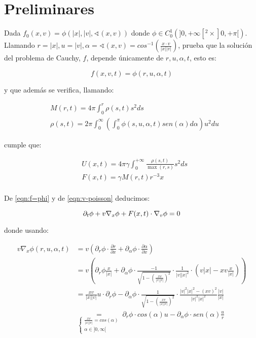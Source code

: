 \documentclass[a4paper,10pt]{scrartcl}
\theoremstyle{definition}
\numberwithin{equation}{section}
\begin{document}
\section{Preliminares}
Dada $f_0(x,v) = \phi(|x|, |v|, \sphericalangle(x,v))$ donde $\phi \in C_0^1(]0,+\infty[^2 \times ]0,+\pi[)$. Llamando $r = |x|, u = |v|, \alpha = \sphericalangle(x,v) = cos^{-1}\left(\frac{x\cdot v}{|x||v|}\right)$, \cite{Batt} prueba que la solución del problema de Cauchy, $f$, depende únicamente de $r, u, \alpha, t$, esto es:

\begin{equation}
\label{eqn:f=phi}
f(x,v,t) = \phi(r,u,\alpha, t)
\end{equation}

y que además se verifica, llamando:

\begin{align*}
 & M(r,t) = 4\pi \int_0^r \rho(s,t) s^2 ds\\
 & \rho(s, t) = 2\pi \int_0^{\infty} \left(\int_0^\pi \phi(s, u, \alpha, t) sen(\alpha) d\alpha \right)u^2 du
\end{align*}

cumple que:

\begin{align*}
 & U(x,t) = 4\pi\gamma \int_0^{+\infty} \frac{\rho(s,t)}{\max(r,s)} s^2 ds\\
 & F(x,t) = \gamma M(r,t) r^{-3} x\\
\end{align*}

De \eqref{eqn:f=phi} y de \eqref{eqn:v-poisson} deducimos:

\[
\partial_t \phi + v \nabla_x \phi + F(x,t) \cdot \nabla_v \phi = 0\\
\]

donde usando:

\begin{align*}
 v \nabla_x \phi(r, u, \alpha, t) &= v \left(\partial_r \phi \cdot \frac{\partial r}{\partial x} + \partial_\alpha \phi \cdot \frac{\partial \alpha}{\partial x} \right)\\
 &= v\left(\partial_r \phi \frac{x}{|x|} + \partial_\alpha \phi \cdot \frac{-1}{\sqrt{1 - \left(\frac{xv}{|x||v|}\right)^2}} \cdot \frac{1}{|v||x|^2} \cdot\left(v|x| - xv \frac{x}{|x|}\right)\right)\\
 &= \frac{xv}{|x||v|} u \cdot\partial_r \phi - \partial_\alpha \phi \cdot \frac{1}{\sqrt{1 - \left(\frac{xv}{|x||v|}\right)^2}} \cdot \frac{|v|^2|x|^2 - (xv)^2}{|v|^2|x|^2} \frac{|v|}{|x|}\\
 &\underset{\left\{\begin{array}{c} \frac{xv}{|x||v|} = cos(\alpha)\\ \alpha \in ]0,\infty[\end{array}\right.}{=} \partial_r \phi \cdot cos(\alpha) u - \partial_\alpha \phi \cdot sen(\alpha) \frac{u}{r}
\end{align*}
\end{document}
